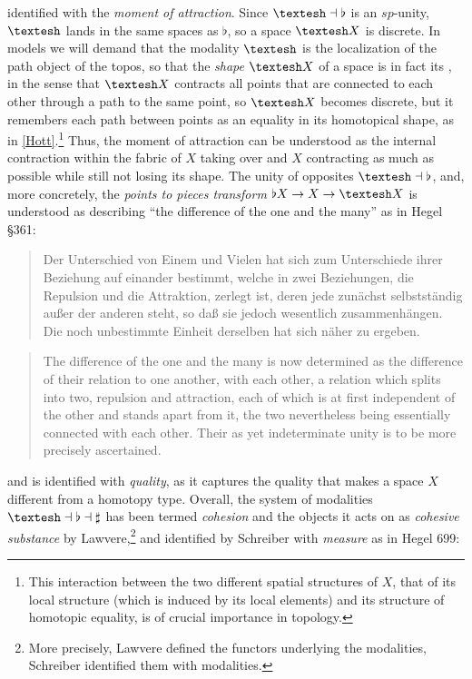 \documentclass{article}
\begin{document}
identified with the \emph{moment of attraction}. Since $\textrm{\textesh}\dashv\flat$ is an $sp$-unity, 
$\textrm{\textesh}$ lands in the same spaces as $\flat$, so a space $\textrm{\textesh} X$ is discrete. In 
models we will demand that the modality 
$\textrm{\textesh}$ is the localization of the path object of the topos, so that the \emph{shape} 
$\textrm{\textesh} X$ of a space is in fact its , in the sense that $\textrm{\textesh} X$ 
contracts all points that are connected to each other through a path to the same point, so $\textrm{\textesh}
X$ becomes discrete, but it remembers each path between points as an equality in its homotopical shape, as in
\ref{Hott}.\footnote{This interaction between the two different spatial structures of $X$,
that of its local structure (which is induced by its local elements) and its structure of homotopic equality,
is of crucial importance in topology.} Thus, the moment of attraction can be understood as the internal
contraction within the fabric of $X$ taking over and $X$ contracting as much as possible while still not
losing its shape. The unity of opposites $\textrm{\textesh}\dashv\flat$, and, more concretely, the
\emph{points to pieces transform} $\flat X\rightarrow X\rightarrow \textrm{\textesh} X$ is understood as
describing ``the difference of the one and the many'' as in Hegel §361:

\begin{quote}
    Der Unterschied von Einem und Vielen hat sich zum Unterschiede ihrer Beziehung auf einander bestimmt, welche in zwei Beziehungen, die Repulsion und die Attraktion, zerlegt ist, deren jede zunächst selbstständig außer der anderen steht, so daß sie jedoch wesentlich zusammenhängen. Die noch unbestimmte Einheit derselben hat sich näher zu ergeben.
\end{quote}
    
\begin{quote}
    The difference of the one and the many is now determined as the difference of their relation to one another, with each other, a relation which splits into two, repulsion and attraction, each of which is at first independent of the other and stands apart from it, the two nevertheless being essentially connected with each other. Their as yet indeterminate unity is to be more precisely ascertained.
\end{quote}

and is identified with \emph{quality}, as it captures the quality that makes a space $X$ different from a
homotopy type. Overall, the system of modalities $\textrm{\textesh}\dashv\flat\dashv\sharp$ has been termed
\emph{cohesion} and the objects it acts on as \emph{cohesive substance} by Lawvere,\cite{Coh}\footnote{More
precisely, Lawvere defined the functors underlying the modalities, Schreiber identified them with
modalities.} and identified by Schreiber with \emph{measure} as in Hegel 699:
\end{document}
